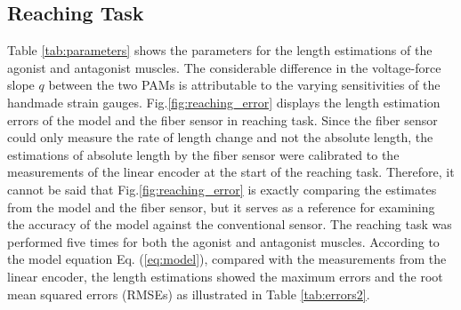\subsection{Reaching Task}
Table \ref{tab:parameters} shows the parameters for the length estimations of the agonist and antagonist muscles. The considerable difference in the voltage-force slope $q$ between the two PAMs is attributable to the varying sensitivities of the handmade strain gauges. Fig.\ref{fig:reaching_error} displays the length estimation errors of the model and the fiber sensor in reaching task. Since the fiber sensor could only measure the rate of length change and not the absolute length, the estimations of absolute length by the fiber sensor were calibrated to the measurements of the linear encoder at the start of the reaching task. Therefore, it cannot be said that Fig.\ref{fig:reaching_error} is exactly comparing the estimates from the model and the fiber sensor, but it serves as a reference for examining the accuracy of the model against the conventional sensor. The reaching task was performed five times for both the agonist and antagonist muscles. 
According to the model equation Eq. (\ref{eq:model}), compared with the measurements from the linear encoder, the length estimations showed the maximum errors and the root mean squared errors (RMSEs) as illustrated in Table \ref{tab:errors2}.
\begin{table}[t]
    \centering
    \caption{Error Percentages of Dynamic Length Estimations under Different Model Equations}
    \label{tab:errors}
\end{table}
\begin{table}[t]
    \centering
    \caption{Parameters for Length Estimations in Reaching Task} 
    \label{tab:parameters}
\end{table}
